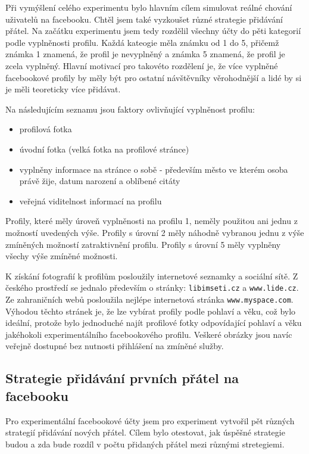 \documentclass[thesis=M,czech]{FITthesis}[2013/05/10]
\begin{document}
Při vymýšlení celého experimentu bylo hlavním cílem simulovat reálné chování uživatelů na facebooku. Chtěl jsem také vyzkoušet různé strategie přidávání přátel. Na začátku experimentu jsem tedy rozdělil všechny účty do pěti kategorií podle vyplněnosti profilu. Každá kateogie měla známku od 1 do 5, přičemž známka 1 znamená, že profil je nevyplněný a známka 5 znamená, že profil je zcela vyplněný. Hlavní motivací pro takovéto rozdělení je, že více vyplněné facebookové profily by měly být pro ostatní návštěvníky věrohodnější a lidé by si je měli teoreticky více přidávat.

Na následujícím seznamu jsou faktory ovlivňující vyplněnost profilu:

\begin{itemize}
  \item profilová fotka
  \item úvodní fotka (velká fotka na profilové stránce)
  \item vyplněny informace na stránce o sobě - především město ve kterém osoba právě žije, datum narození a oblíbené citáty
  \item veřejná viditelnost informací na profilu
\end{itemize}

Profily, které měly úroveň vyplněnosti na profilu 1, neměly použitou ani jednu z možností uvedených výše. Profily s úrovní 2 měly náhodně vybranou jednu z výše zmíněných možností zatraktivnění profilu. Profily s úrovní 5 měly vyplněny všechy výše zmíněné možnosti.

K získání fotografií k profilům posloužily internetové seznamky a sociální sítě. Z českého prostředí se jednalo především o stránky: \verb|libimseti.cz| a \verb|www.lide.cz|. Ze zahraničních webů posloužila nejlépe internetová stránka \verb|www.myspace.com|. Výhodou těchto stránek je, že lze vybírat profily podle pohlaví a věku, což bylo ideální, protože bylo jednoduché najít profilové fotky odpovídající pohlaví a věku jakéhokoli experimentálního facebookového profilu. Veškeré obrázky jsou navíc veřejně dostupné bez nutnosti přihlášení na zmíněné služby.

\subsection{Strategie přidávání prvních přátel na facebooku}

Pro experimentální facebookové účty jsem pro experiment vytvořil pět různých strategií přidávání nových přátel. Cílem bylo otestovat, jak úspěšné strategie budou a zda bude rozdíl v počtu přidaných přátel mezi různými stretegiemi. 
\end{document}
